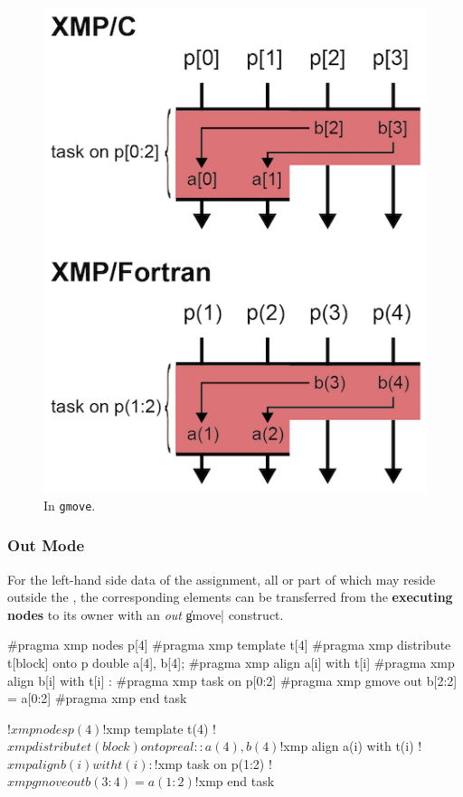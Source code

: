 \begin{figure}
  \centering
  \includegraphics{figs/gmove_in.png}
  \caption{In {\tt gmove}.}
\end{figure}


\subsubsection{Out Mode}

For the left-hand side data of the assignment, all or part of which may
reside outside the {\enset}, the corresponding elements can be
transferred from the {\bf executing nodes} to its owner {\nodes} with an {\it out}
\|gmove| construct.

\begin{XCexample}
#pragma xmp nodes p[4]
#pragma xmp template t[4]
#pragma xmp distribute t[block] onto p
double a[4], b[4];
#pragma xmp align a[i] with t[i]
#pragma xmp align b[i] with t[i]
   :
#pragma xmp task on p[0:2]
#pragma xmp gmove out
  b[2:2] = a[0:2]
#pragma xmp end task
\end{XCexample}

\begin{XFexample}
!$xmp nodes p(4)
!$xmp template t(4)
!$xmp distribute t(block) onto p
real :: a(4), b(4)
!$xmp align a(i) with t(i)
!$xmp align b(i) with t(i)
   :
!$xmp task on p(1:2)
!$xmp gmove out
  b(3:4) = a(1:2)
!$xmp end task
\end{XFexample}

